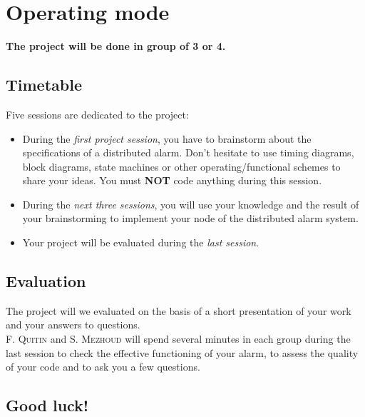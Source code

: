 \documentclass[10pt,a4paper]{article}
\theoremstyle{definition}%
\begin{document}
\section{Operating mode}
\textbf{\color{red}The project will be done in group of 3 or 4.}
\subsection{Timetable}
Five sessions are dedicated to the project:
\begin{itemize}
\item During the \emph{first project session}, you have to brainstorm about the specifications of a distributed alarm. Don't hesitate to use timing diagrams, block diagrams, state machines  or other operating/functional schemes to share your ideas. You must \textbf{NOT} code anything during this session.
\item During the \emph{next three sessions}, you will use your knowledge and the result of your brainstorming to implement your node of the distributed alarm system. 
\item Your project will be evaluated during the \emph{last session}.
\end{itemize}


\subsection{Evaluation}
The project will we evaluated on the basis of a short presentation of your work and your answers to questions.\\
\textsc{F. Quitin} and \textsc{S. Mezhoud} will spend several minutes in each group during the last session to check the effective functioning of your alarm, to assess the quality of your code and to ask you a few questions.

\begin{flushright}
\section*{Good luck!}
\end{flushright}
\end{document}
